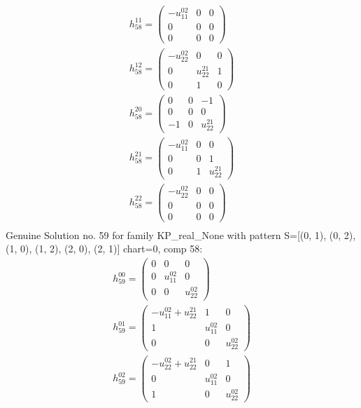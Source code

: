 \documentclass[a4paper, 11pt, twoside, onecolumn]{article}
\begin{document}
\begin{landscape}
\begin{gather*}
	 h_{58}^{11}=\begin{pmatrix}- u^{02}_{11} & 0 & 0\\0 & 0 & 0\\0 & 0 & 0\end{pmatrix}\\ 
	 h_{58}^{12}=\begin{pmatrix}- u^{02}_{22} & 0 & 0\\0 & u^{21}_{22} & 1\\0 & 1 & 0\end{pmatrix}\\ 
	 h_{58}^{20}=\begin{pmatrix}0 & 0 & -1\\0 & 0 & 0\\-1 & 0 & u^{21}_{22}\end{pmatrix}\\ 
	 h_{58}^{21}=\begin{pmatrix}- u^{02}_{11} & 0 & 0\\0 & 0 & 1\\0 & 1 & u^{21}_{22}\end{pmatrix}\\ 
	 h_{58}^{22}=\begin{pmatrix}- u^{02}_{22} & 0 & 0\\0 & 0 & 0\\0 & 0 & 0\end{pmatrix}\\ 
\end{gather*} 
Genuine Solution no. 59 for family KP_real_None with pattern S=[(0, 1), (0, 2), (1, 0), (1, 2), (2, 0), (2, 1)] chart=0, comp 58: 
\begin{gather*} 
	 h_{59}^{00}=\begin{pmatrix}0 & 0 & 0\\0 & u^{02}_{11} & 0\\0 & 0 & u^{02}_{22}\end{pmatrix}\\ 
	 h_{59}^{01}=\begin{pmatrix}- u^{02}_{11} + u^{21}_{22} & 1 & 0\\1 & u^{02}_{11} & 0\\0 & 0 & u^{02}_{22}\end{pmatrix}\\ 
	 h_{59}^{02}=\begin{pmatrix}- u^{02}_{22} + u^{21}_{22} & 0 & 1\\0 & u^{02}_{11} & 0\\1 & 0 & u^{02}_{22}\end{pmatrix}\\ 

\end{gather*}
\end{landscape}
\end{document}

